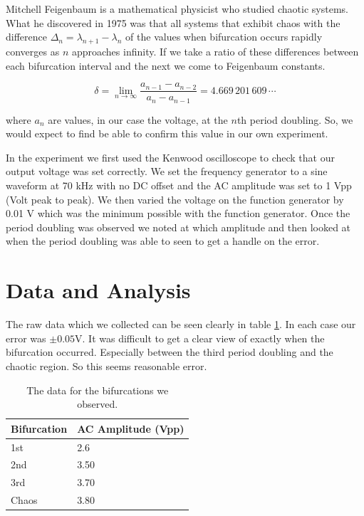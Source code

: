 \documentclass[12pt letterpaper]{article}
\begin{document}
Mitchell Feigenbaum is a mathematical physicist who studied chaotic systems. What he discovered in 1975 was that all systems that exhibit chaos with the difference $\Delta_n = \lambda_{n+1} - \lambda_n$ of the values when bifurcation occurs rapidly converges as $n$ approaches infinity. If we take a ratio of these differences between each bifurcation interval and the next we come to Feigenbaum constants. 

\begin{equation}
\label{feigenbaum}
\delta = \lim_{n\rightarrow \infty} \frac{a_{n-1} - a_{n-2}}{a_n - a_{n-1}} = 4.669\,201\,609\,\cdots
\end{equation}

where $a_n$ are values, in our case the voltage, at the $n$th period doubling. So, we would expect to find be able to confirm this value in our own experiment. 

In the experiment we first used the Kenwood oscilloscope to check that our output voltage was set correctly. We set the frequency generator to a sine waveform at 70 kHz with no DC offset and the AC amplitude was set to 1 Vpp (Volt peak to peak). We then varied the voltage on the function generator by 0.01 V which was the minimum possible with the function generator. Once the period doubling was observed we noted at which amplitude and then looked at when the period doubling was able to seen to get a handle on the error. 


\section*{Data and Analysis}

The raw data which we collected can be seen clearly in table \ref{table:data}. In each case our error was $\pm0.05$V. 
It was difficult to get a clear view of exactly when the bifurcation occurred. Especially between the third period doubling and the chaotic region. So this seems reasonable error. 

\begin{table}[H]
\centering
\caption{The data for the bifurcations we observed.}
\label{table:data}
\begin{tabular}{|l|l|}
\hline
Bifurcation & AC Amplitude (Vpp) \\ \hline
1st         & 2.6                \\ \hline
2nd         & 3.50                \\ \hline
3rd         & 3.70                \\ \hline
Chaos       & 3.80                \\ \hline
\end{tabular}
\end{table}
\end{document}
